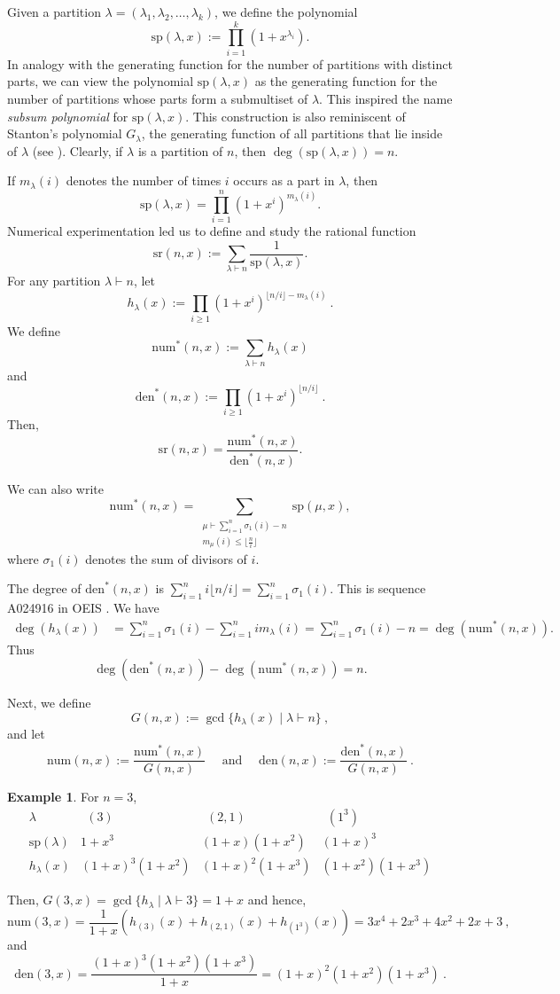 \documentclass[reqno]{amsart}
\def\gh{\gcd\{h_\lambda(x)\mid\lambda\vdash n\}}
\def\G{G}
\def\sp{\mathrm{sp}}
\def\sr{\mathrm{sr}}
\def\den{\mathrm{den}}
\def\num{\mathrm{num}}
\theoremstyle{definition}
\newtheorem{example}{Example}
\begin{document}
Given a partition  $\lambda=(\lambda_1, \lambda_2, \ldots, \lambda_k)$, we define  the polynomial $$\sp(\lambda, x):=\prod_{i=1}^k(1+x^{\lambda_i}).$$  In analogy with the generating function for the number of partitions with distinct parts, we can view the polynomial $\sp(\lambda, x)$  as the generating function for the number of partitions whose parts form a submultiset of $\lambda$.  This inspired  the name \textit{subsum polynomial} for $\sp(\lambda, x)$. This construction is also reminiscent of Stanton's polynomial $G_\lambda$, the generating function of all partitions that lie inside of $\lambda$ (see \cite{Sta90}).
Clearly, if $\lambda$ is a partition of $n$, then $\deg(\sp(\lambda,x))=n$.







If $m_\lambda(i)$ denotes  the number of times $i$ occurs as a part in $\lambda$, then $$\sp(\lambda, x)=\prod_{i=1}^n(1+x^i)^{m_\lambda(i)}.$$
Numerical experimentation led us to  define and study the rational function $$\sr(n,x):=\sum_{\lambda\vdash n} \frac{1}{\sp(\lambda, x)}.$$ 
For any partition $\lambda\vdash n$, let
\[h_\lambda(x):=\prod_{i\geq 1}(1+x^i)^{\lfloor n/i\rfloor-m_\lambda(i)}\:.\] 
We define
$$\num^*(n,x):=\sum_{\lambda\vdash n}h_\lambda(x) $$ and $$\den^*(n,x):=\prod_{i\geq 1}(1+x^i)^{\lfloor n/i\rfloor}\:.$$ 
Then, $$\sr(n,x)=\frac{\num^*(n,x)}{\den^*(n,x)}.$$

We can also write
\[
\num^*(n,x)=\sum_{\substack{\mu \vdash \sum_{i=1}^n\sigma_1(i)-n\\ m_\mu(i)\leq \lfloor \frac{n}{i}\rfloor}}\sp(\mu,x),
\]
where $\sigma_1(i)$ denotes the sum of divisors of $i$. 

The degree of $\den^*(n,x)$ is $\sum_{i=1}^n i\lfloor n/i\rfloor = \sum_{i=1}^{n}\sigma_1(i)$.  This is sequence A024916 in OEIS \cite{OEIS}. 
We have \begin{align*}\deg(h_\lambda(x))& = \sum_{i=1}^n \sigma_1(i)-\sum_{i=1}^nim_\lambda(i)=\sum_{i=1}^n \sigma_1(i)- n=
\deg(\num^*(n,x)).\end{align*}
  Thus $$\deg(\den^*(n,x))-\deg(\num^*(n,x))= n.$$



Next, we define 
$$\G(n,x):=\gh\:,$$ and let
\[\num(n,x):=\frac{\num^*(n,x)}{G(n,x)}\quad \textrm{ and }\quad \den(n,x):=\frac{\den^*(n,x)}{G(n,x)}\:.\]

\begin{example}
    For $n=3$,  
    \[\begin{array}{c||c|c|c}\lambda& \ \ (3)\ \  & \ \ (2,1) \ \ & \ \ (1^3) \ \ \\ \hline \sp(\lambda)  & 1+x^3 & (1+x)(1+x^2)& (1+x)^3 \\  \hline h_\lambda(x)& (1+x)^3(1+x^2)&(1+x)^2(1+x^3) & (1+x^2)(1+x^3) \end{array}\] 
    
    Then, $G(3,x)=\gcd\{h_\lambda \mid \lambda \vdash 3\}=1+x$ and hence, \[\num(3,x)=\frac{1}{1+x}\left(h_{(3)}(x)+h_{(2,1)}(x)+h_{(1^3)}(x)\right)= 3x^4+2x^3+4x^2+2x+3\:,\]
    and 
    \[\den(3,x)=\frac{(1+x)^3(1+x^2)(1+x^3)}{1+x}=(1+x)^2(1+x^2)(1+x^3)\:.\]
\end{example}
\end{document}
